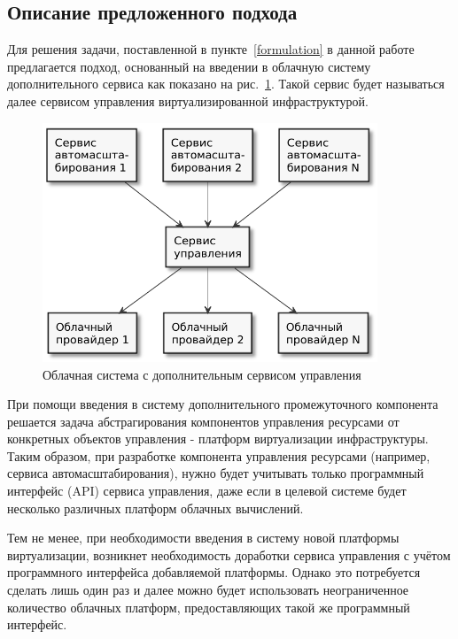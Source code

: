 \subsection{Описание предложенного подхода}
Для решения задачи, поставленной в пункте~\ref{formulation} в данной работе предлагается подход, основанный на введении в облачную систему дополнительного сервиса как показано на рис.~\ref{suggested-approach}.
Такой сервис будет называться далее сервисом управления виртуализированной инфраструктурой.

\begin{figure}[hbtp]
    \centering
    \includegraphics[width=10cm]{img/suggested-approach.pdf}
    \caption{Облачная система с дополнительным сервисом управления}
    \label{suggested-approach}
\end{figure}

При помощи введения в систему дополнительного промежуточного компонента решается задача абстрагирования компонентов управления ресурсами от конкретных объектов управления - платформ виртуализации инфраструктуры. 
Таким образом, при разработке компонента управления ресурсами (например, сервиса автомасштабирования), нужно будет учитывать только программный интерфейс (API) сервиса управления, даже если в целевой системе будет несколько различных платформ облачных вычислений.

Тем не менее, при необходимости введения в систему новой платформы виртуализации, возникнет необходимость доработки сервиса управления с учётом программного интерфейса добавляемой платформы.
Однако это потребуется сделать лишь один раз и далее можно будет использовать неограниченное количество облачных платформ, предоставляющих такой же программный интерфейс.

\FloatBarrier 

